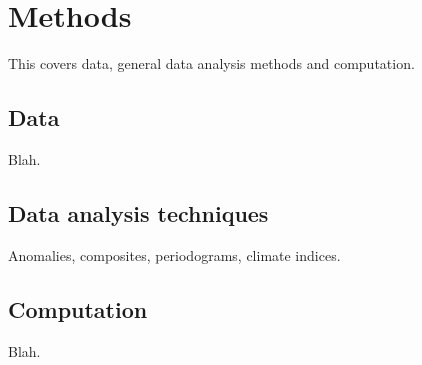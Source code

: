 
\chapter{Methods}


This covers data, general data analysis methods and computation.

\section{Data}


Blah.


\section{Data analysis techniques}


Anomalies, composites, periodograms, climate indices.


\section{Computation}


Blah.